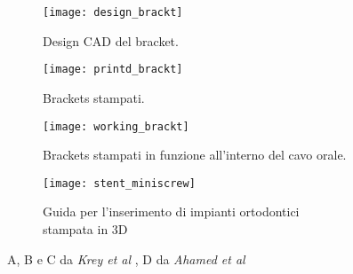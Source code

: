 \begin{figure}[h!]
\begin{subfigure}{0.5\textwidth}
\centering
\texttt{[image: design\_brackt]} 
\caption{Design CAD del bracket.}
\label{fig:design_brackt}
\end{subfigure}
\begin{subfigure}{0.5\textwidth}
\centering
\texttt{[image: printd\_brackt]}
\caption{Brackets stampati.}
\label{fig:printd_brackt}
\end{subfigure}
\begin{subfigure}{0.5\textwidth}
\centering
\texttt{[image: working\_brackt]}
\caption{Brackets stampati in funzione all'interno del cavo orale.}
\label{fig:working_brackt}
\end{subfigure}
\begin{subfigure}{0.5\textwidth}
\centering
\texttt{[image: stent\_miniscrew]}
\caption{Guida per l'inserimento di impianti ortodontici stampata in 3D}
\label{fig:stent_miniscrew}
\end{subfigure}
\caption{A, B e C da \emph{Krey et al} \parencite{Reference115}, D da \emph{Ahamed et al} \parencite{Reference116}}
\label{fig:3d_ortho}
\end{figure}

